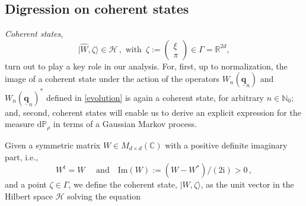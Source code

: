 \documentclass[11pt]{article}
\renewcommand\i{\mathrm{i}}
\renewcommand{\d}{{\mathrm d}}
\begin{document}
\subsection{Digression on coherent states}\label{coh-states}
\textit{Coherent states}, 
$$\vert \widehat{W}, \zeta \rangle \in \mathcal{H}\,,  \text{ with  }\,
\zeta := \begin{pmatrix} \xi \\ \pi \end{pmatrix} \in \Gamma =\mathbb{R}^{2d} ,$$
 turn out to play a key role in our analysis. For, first, up to normalization, the image of a coherent state under the action of the operators $W_{n}(\underline{\mathbf{q}}_n)$ and $W_{n}(\underline{\mathbf{q}}_n)^{*}$ defined in \eqref{evolution} is again a coherent state, for arbitrary $n\in \mathbb{N}_0$; and, second, coherent states will enable us to derive an explicit expression for the measure $\d\mathbb{P}_{\rho}$ in terms of a Gaussian Markov process.

Given a symmetric matrix $W \in M_{d \times d}(\mathbb{C})$ with a positive definite imaginary part, i.e.,
\begin{equation}\label{squeeze}
W^t = W\quad \text{ and} \quad \mathrm{Im}(W):=(W -W^*)/(2 \i) > 0\,,
\end{equation}
and a point $\zeta\in \Gamma$, we define the coherent state, $\vert W, \zeta \rangle$, as the unit vector in the Hilbert space $\mathcal{H}$ solving the equation
\end{document}
